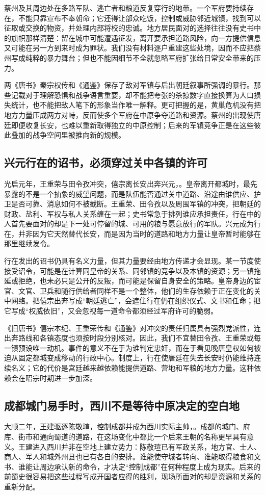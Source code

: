 蔡州及其周边处在多路军队、逃亡者和粮道反复穿行的地带。一个军府要持续存在，不能只靠宣布不奉朝命；它还得让部众吃饭，控制或威胁邻近城镇，找到可以征取或交换的物资，并处理内部将校的忠诚。地方居民面对的选择往往没有史书中的旗帜那样清楚：留在城中可能遭遇征发，离开要承担道路风险，向一方提供信息又可能在另一方到来时成为罪状。我们没有材料逐户重建这些处境，因而不应把蔡州写成纯粹的暴力舞台；但也不能因细节不全就忽略军府扩张给日常安全带来的压力。

两《唐书》秦宗权传和《通鉴》保存了敌对军镇与后出朝廷叙事所强调的暴行。那些记载对于理解恐惧和战争语言重要，却不能把夸张的杀掠数字直接换算为人口损失统计，也不能把敌人笔下的形象当作唯一解释。更可把握的是，黄巢危机没有把地方力量压成两方对峙，反而使多个军府在中原争夺道路和资源。蔡州的出现使唐廷即便收复长安，也难以重新取得独立的中原控制；后来的军镇竞争正是在这些彼此叠加的战争空间里被推向新的规模。

\subsection{兴元行在的诏书，必须穿过关中各镇的许可}
光启元年，王重荣与田令孜冲突，僖宗离长安出奔兴元，。皇帝离开都城时，最先暴露的不是一个抽象的威望问题，而是队伍能否通过关中道路、沿途由谁供应、护卫是否可靠、消息如何不被截断。王重荣、田令孜以及周围军镇的冲突，把朝廷的财政、盐利、军权与私人关系缠在一起；史书常急于排列谁应承担责任，行在中的人首先要面对的却是下一处可停留的城、可用的粮与愿意放行的军队。兴元成为行在，并非因为它天然替代长安，而是因为当时的道路和地方力量让皇帝暂时能够在那里继续发令。

行在发出的诏书仍具有名义力量，但其力量要经由地方传递才会显现。某一节度使接受诏令，可能是在计算同皇帝的关系、同邻镇的竞争以及本镇的资源；另一镇拖延或拒绝，也未必只是公开的反叛，而可能是保留自身安全的策略。皇帝身边的宦官、文官、卫兵和随行供给者同样不是一个整体，他们的生存依赖于正在变化的关中网络。把僖宗出奔写成“朝廷逃亡”，会遮住行在仍在组织仪式、文书和任命；把它写成“权威依旧”，又会忽视每一道命令都须经过军府许可的脆弱。

《旧唐书》僖宗本纪、王重荣传和《通鉴》对冲突的责任归属具有强烈党派性，连出奔路线和各镇态度也须按时段分别核对。因此，我们不宜替田令孜、王重荣或每一镇预设唯一动机。事件的意义不在于为谁判定忠奸，而在于看见晚唐皇权如何被迫从固定都城变成移动的行政中心。制度上，行在使唐廷在失去长安时仍能维持连续名义；它的代价是宫廷越来越依赖能提供道路、营地和军粮的地方力量。这种依赖会在昭宗时期进一步加深。

\subsection{成都城门易手时，西川不是等待中原决定的空白地}
大顺二年，王建驱逐陈敬瑄，控制成都并成为西川实际主帅，。成都的城门、府库、街市和通向蜀道的道路，在这场变化中都比一个后来王朝的名称更早具有意义。王建进入西川并非在空地上建立势力：陈敬瑄已有军政关系，地方官、士人、商人、军人和城外州县也已有各自的安排。谁能使守城者转向、谁能取得粮食和文书、谁能让周边承认新的命令，才决定“控制成都”在何种程度上成为现实。后来的前蜀史很容易把这些过程写成开国者应得的胜利，现场所面对的却是资源和关系的重新分配。

